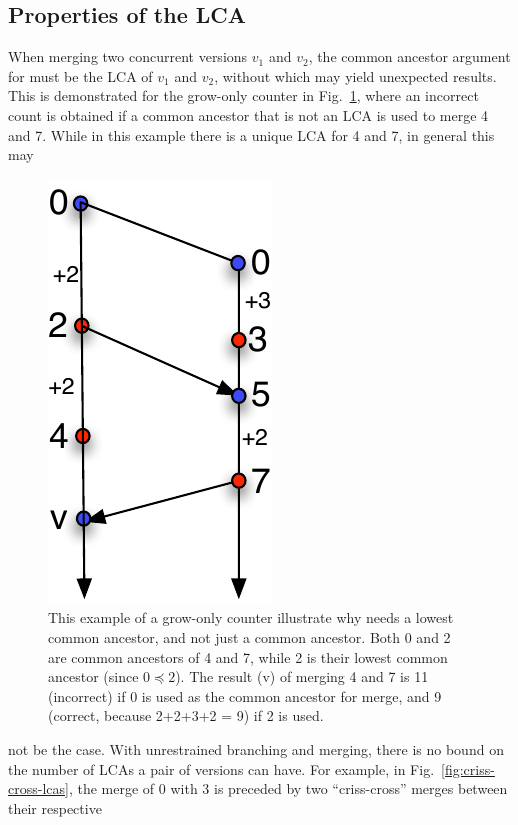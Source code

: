\subsection{Properties of the LCA}
\label{sec:meta}

When merging two concurrent versions $v_1$ and $v_2$, the common
ancestor argument for  must be the LCA of $v_1$ and $v_2$,
without which  may yield unexpected results. This is
demonstrated for the grow-only counter in
Fig.~\ref{fig:merge-needs-lca}, where an incorrect count is obtained if a
common ancestor that is not an LCA is used to merge 4 and 7. While in
this example there is a unique LCA for 4 and 7, in general this may
\begin{figure}
\centering
\includegraphics[scale=0.6]{Figures/merge-needs-lca}
\caption{This example of a grow-only counter illustrate why 
needs a lowest common ancestor, and not just a common ancestor. Both 0
and 2 are common ancestors of 4 and 7, while 2 is their lowest common
ancestor (since $0 \preceq 2$). The result (v) of merging 4 and 7 is
11 (incorrect) if 0 is used as the common ancestor for merge, and 9
(correct, because 2+2+3+2 = 9) if 2 is used. }
\label{fig:merge-needs-lca}
\end{figure}
not be the case. With unrestrained branching and merging, there is no
bound on the number of LCAs a pair of versions can have.  For example,
in Fig.~\ref{fig:criss-cross-lcas}, the merge of 0 with 3 is preceded
by two ``criss-cross'' merges between their respective
